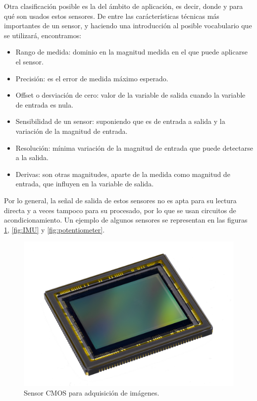 Otra clasificación posible es la del ámbito de aplicación, es decir, donde y para qué son usados estos sensores. \newline
De entre las carácterísticas técnicas más importantes de un sensor, y haciendo una introducción al posible vocabulario que se utilizará, encontramos:

\begin{itemize}
	\item Rango de medida:  dominio en la magnitud medida en el que puede aplicarse el sensor.
	\item Precisión: es el error de medida máximo esperado.
	\item Offset o desviación de cero: valor de la variable de salida cuando la variable de entrada es nula.
	\item Sensibilidad de un sensor: suponiendo que es de entrada a salida y la variación de la magnitud de entrada.
	\item Resolución: mínima variación de la magnitud de entrada que puede detectarse a la salida.
	\item Derivas: son otras magnitudes, aparte de la medida como magnitud de entrada, que influyen en la variable de salida.
\end{itemize}

Por lo general, la señal de salida de estos sensores no es apta para su lectura directa y a veces tampoco para su procesado, por lo que se usan circuitos de acondicionamiento. Un ejemplo de algunos sensores se representan en las figuras \ref{fig:camara_CMOS}, \ref{fig:IMU} y \ref{fig:potentiometer}.

\begin{center}
	\begin{figure}[H]
		\center
		\includegraphics[scale=0.1]{imagenes/EstadoArte/sensor_imagen_CMOS.jpg}
		\caption{Sensor CMOS para adquisición de imágenes.}
		\label{fig:camara_CMOS}
	\end{figure}
\end{center}

